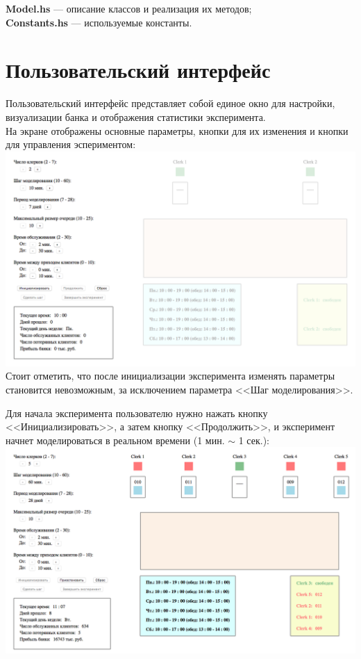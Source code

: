 \documentclass[oneside,final,12pt]{article}
\begin{document}
\textbf{Model.hs} --- описание классов и реализация их методов;\\

\textbf{Constants.hs} --- используемые константы.\\
\newpage
\section{Пользовательский интерфейс}
 
Пользовательский интерфейс представляет собой единое окно для настройки, визуализации банка и отображения статистики эксперимента.\\

На экране отображены основные параметры, кнопки для их изменения и кнопки для управления эспериментом:\\

 \includegraphics[width=150mm]{not_inited.png}\\
 
 Стоит отметить, что после инициализации эксперимента изменять параметры становится невозможным, за исключением параметра <<Шаг моделирования>>.\\
 
 \newpage
 
 Для начала эксперимента пользователю нужно нажать кнопку <<Инициализировать>>, а затем кнопку <<Продолжить>>, и эксперимент начнет моделироваться в реальном времени (1 мин. $\sim$ 1 сек.):\\
 
 \includegraphics[width=150mm]{processing.png}\\
\end{document}
